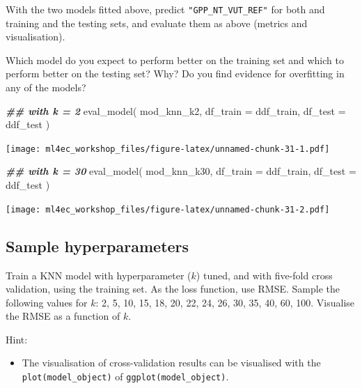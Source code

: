 \documentclass[
]{book}
\newenvironment{Shaded}{\begin{snugshade}}{\end{snugshade}}
\newcommand{\AttributeTok}[1]{\textcolor[rgb]{0.77,0.63,0.00}{#1}}
\newcommand{\DocumentationTok}[1]{\textcolor[rgb]{0.56,0.35,0.01}{\textbf{\textit{#1}}}}
\newcommand{\FunctionTok}[1]{\textcolor[rgb]{0.00,0.00,0.00}{#1}}
\newcommand{\NormalTok}[1]{#1}
\providecommand{\tightlist}{%
  \setlength{\itemsep}{0pt}\setlength{\parskip}{0pt}}
\begin{document}
With the two models fitted above, predict \texttt{"GPP\_NT\_VUT\_REF"} for both and training and the testing sets, and evaluate them as above (metrics and visualisation).

Which model do you expect to perform better on the training set and which to perform better on the testing set? Why? Do you find evidence for overfitting in any of the models?

\begin{Shaded}
\begin{Highlighting}[]
\DocumentationTok{\#\# with k = 2}
\FunctionTok{eval\_model}\NormalTok{(}
\NormalTok{  mod\_knn\_k2, }
  \AttributeTok{df\_train =}\NormalTok{ ddf\_train, }
  \AttributeTok{df\_test =}\NormalTok{ ddf\_test}
\NormalTok{  )}
\end{Highlighting}
\end{Shaded}

\texttt{[image: ml4ec\_workshop\_files/figure-latex/unnamed-chunk-31-1.pdf]}

\begin{Shaded}
\begin{Highlighting}[]
\DocumentationTok{\#\# with k = 30}
\FunctionTok{eval\_model}\NormalTok{(}
\NormalTok{  mod\_knn\_k30, }
  \AttributeTok{df\_train =}\NormalTok{ ddf\_train, }
  \AttributeTok{df\_test =}\NormalTok{ ddf\_test}
\NormalTok{  )}
\end{Highlighting}
\end{Shaded}

\texttt{[image: ml4ec\_workshop\_files/figure-latex/unnamed-chunk-31-2.pdf]}

\hypertarget{sample-hyperparameters}{%
\subsection{Sample hyperparameters}\label{sample-hyperparameters}}

Train a KNN model with hyperparameter (\(k\)) tuned, and with five-fold cross validation, using the training set. As the loss function, use RMSE. Sample the following values for \(k\): 2, 5, 10, 15, 18, 20, 22, 24, 26, 30, 35, 40, 60, 100. Visualise the RMSE as a function of \(k\).

Hint:

\begin{itemize}
\tightlist
\item
  The visualisation of cross-validation results can be visualised with the \texttt{plot(model\_object)} of \texttt{ggplot(model\_object)}.
\end{itemize}
\end{document}
